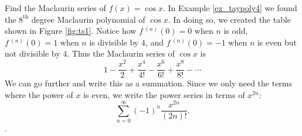 {Find the Maclaurin series of $f(x)=\cos x$.}
{In Example \ref{ex_taypoly4} we found the $8^\text{th}$ degree Maclaurin polynomial of $\cos x$. In doing so, we created the table shown in Figure \ref{fig:ts1}.
Notice how $f\,^{(n)}(0)=0$ when $n$ is odd,  $f\,^{(n)}(0)=1$ when $n$ is divisible by $4$, and $f\,^{(n)}(0)=-1$ when $n$ is even but not divisible by 4. Thus the Maclaurin series of $\cos x$ is
$$1-\frac{x^2}2+\frac{x^4}{4!}-\frac{x^6}{6!}+\frac{x^8}{8!} - \cdots$$
We can go further and write this as a summation. Since we only need the terms where the power of $x$ is even, we write the power series in terms of $x^{2n}$:
$$\sum_{n=0}^\infty (-1)^{n}\frac{x^{2n}}{(2n)!}.$$
.\baselineskip
}\\


